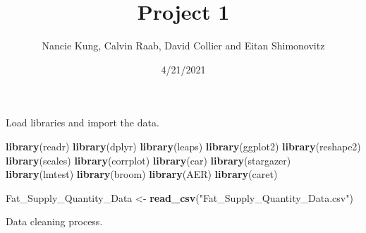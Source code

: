 \documentclass[
]{article}
\title{Project 1}
\author{Nancie Kung, Calvin Raab, David Collier and Eitan Shimonovitz}
\date{4/21/2021}
\newenvironment{Shaded}{\begin{snugshade}}{\end{snugshade}}
\newcommand{\KeywordTok}[1]{\textcolor[rgb]{0.13,0.29,0.53}{\textbf{#1}}}
\newcommand{\NormalTok}[1]{#1}
\newcommand{\StringTok}[1]{\textcolor[rgb]{0.31,0.60,0.02}{#1}}
\begin{document}
\maketitle

Load libraries and import the data.

\begin{Shaded}
\begin{Highlighting}[]
\KeywordTok{library}\NormalTok{(readr)}
\KeywordTok{library}\NormalTok{(dplyr)}
\KeywordTok{library}\NormalTok{(leaps)}
\KeywordTok{library}\NormalTok{(ggplot2)}
\KeywordTok{library}\NormalTok{(reshape2)}
\KeywordTok{library}\NormalTok{(scales)}
\KeywordTok{library}\NormalTok{(corrplot)}
\KeywordTok{library}\NormalTok{(car)}
\KeywordTok{library}\NormalTok{(stargazer)}
\KeywordTok{library}\NormalTok{(lmtest)}
\KeywordTok{library}\NormalTok{(broom)}
\KeywordTok{library}\NormalTok{(AER)}
\KeywordTok{library}\NormalTok{(caret)}

\NormalTok{Fat_Supply_Quantity_Data <-}\StringTok{ }\KeywordTok{read_csv}\NormalTok{(}\StringTok{"Fat_Supply_Quantity_Data.csv"}\NormalTok{)}
\end{Highlighting}
\end{Shaded}

Data cleaning process.
\end{document}
